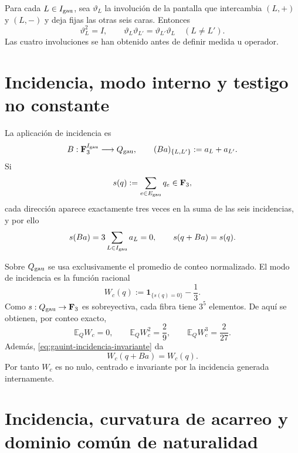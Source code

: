 Para cada \(L\in I_{\rm gau}\), sea \(\vartheta_L\) la involución de la
pantalla que intercambia \((L,+)\) y \((L,-)\) y deja fijas las otras seis
caras. Entonces
\begin{equation}\label{eq:gauint-cuatro-involuciones}
 \vartheta_L^2=I,
 \qquad
 \vartheta_L\vartheta_{L'}=\vartheta_{L'}\vartheta_L
 \quad(L\ne L').
\end{equation}
Las cuatro involuciones se han obtenido antes de definir medida u operador.

\section{Incidencia, modo interno y testigo no constante}

La aplicación de incidencia es
\begin{equation}\label{eq:gauint-incidencia-b}
 B:\mathbf F_3^{I_{\rm gau}}\longrightarrow Q_{\rm gau},
 \qquad
 (Ba)_{\{L,L'\}}:=a_L+a_{L'}.
\end{equation}
Si
\[
 s(q):=\sum_{e\in E_{\rm gau}}q_e\in\mathbf F_3,
\]
cada dirección aparece exactamente tres veces en la suma de las seis
incidencias, y por ello
\begin{equation}\label{eq:gauint-incidencia-invariante}
 s(Ba)=3\sum_{L\in I_{\rm gau}}a_L=0,
 \qquad
 s(q+Ba)=s(q).
\end{equation}

Sobre \(Q_{\rm gau}\) se usa exclusivamente el promedio de conteo
normalizado. El modo de incidencia es la función racional
\begin{equation}\label{eq:gauint-wc-definicion}
 W_c(q):=\mathbf 1_{\{s(q)=0\}}-\frac13.
\end{equation}
Como \(s:Q_{\rm gau}\to\mathbf F_3\) es sobreyectiva, cada fibra tiene
\(3^5\) elementos. De aquí se obtienen, por conteo exacto,
\begin{equation}\label{eq:gauint-wc-momentos}
 \mathbb E_{Q}W_c=0,
 \qquad
 \mathbb E_{Q}W_c^2=\frac29,
 \qquad
 \mathbb E_{Q}W_c^3=\frac{2}{27}.
\end{equation}
Además, \eqref{eq:gauint-incidencia-invariante} da
\begin{equation}\label{eq:gauint-wc-invariancia}
 W_c(q+Ba)=W_c(q).
\end{equation}
Por tanto \(W_c\) es no nulo, centrado e invariante por la incidencia
generada internamente.

\fi
\section{Incidencia, curvatura de acarreo y dominio común de naturalidad}

